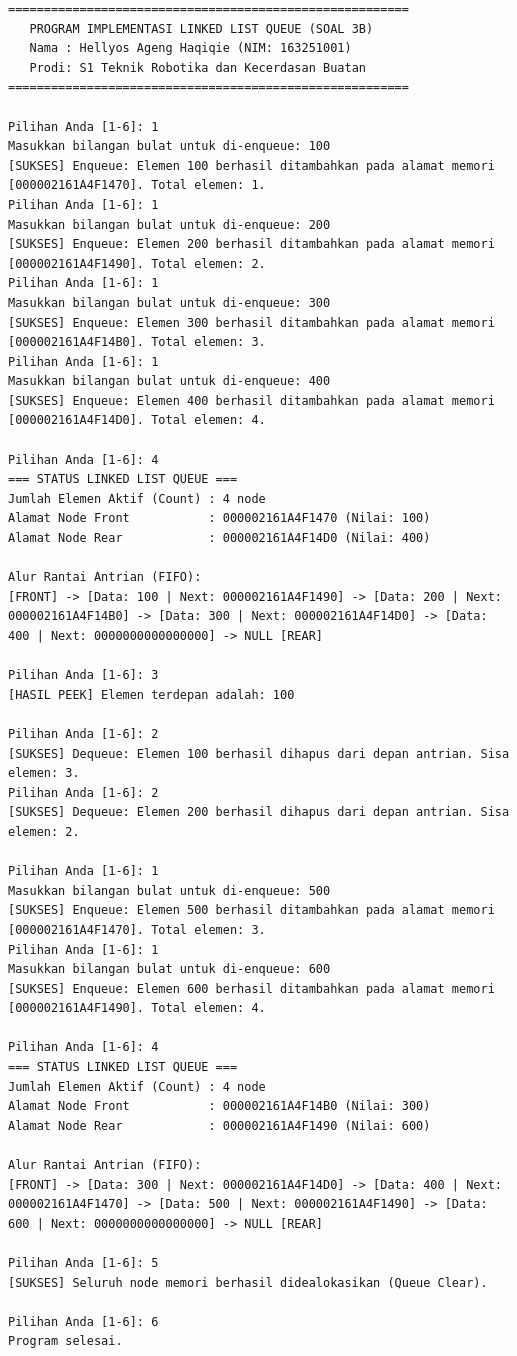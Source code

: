 \documentclass[11pt,a4paper]{article}
\begin{document}
\begin{lstlisting}[style=cmdoutput]
========================================================
   PROGRAM IMPLEMENTASI LINKED LIST QUEUE (SOAL 3B)    
   Nama : Hellyos Ageng Haqiqie (NIM: 163251001)       
   Prodi: S1 Teknik Robotika dan Kecerdasan Buatan      
========================================================

Pilihan Anda [1-6]: 1
Masukkan bilangan bulat untuk di-enqueue: 100
[SUKSES] Enqueue: Elemen 100 berhasil ditambahkan pada alamat memori [000002161A4F1470]. Total elemen: 1.
Pilihan Anda [1-6]: 1
Masukkan bilangan bulat untuk di-enqueue: 200
[SUKSES] Enqueue: Elemen 200 berhasil ditambahkan pada alamat memori [000002161A4F1490]. Total elemen: 2.
Pilihan Anda [1-6]: 1
Masukkan bilangan bulat untuk di-enqueue: 300
[SUKSES] Enqueue: Elemen 300 berhasil ditambahkan pada alamat memori [000002161A4F14B0]. Total elemen: 3.
Pilihan Anda [1-6]: 1
Masukkan bilangan bulat untuk di-enqueue: 400
[SUKSES] Enqueue: Elemen 400 berhasil ditambahkan pada alamat memori [000002161A4F14D0]. Total elemen: 4.

Pilihan Anda [1-6]: 4
=== STATUS LINKED LIST QUEUE ===
Jumlah Elemen Aktif (Count) : 4 node
Alamat Node Front           : 000002161A4F1470 (Nilai: 100)
Alamat Node Rear            : 000002161A4F14D0 (Nilai: 400)

Alur Rantai Antrian (FIFO):
[FRONT] -> [Data: 100 | Next: 000002161A4F1490] -> [Data: 200 | Next: 000002161A4F14B0] -> [Data: 300 | Next: 000002161A4F14D0] -> [Data: 400 | Next: 0000000000000000] -> NULL [REAR]

Pilihan Anda [1-6]: 3
[HASIL PEEK] Elemen terdepan adalah: 100

Pilihan Anda [1-6]: 2
[SUKSES] Dequeue: Elemen 100 berhasil dihapus dari depan antrian. Sisa elemen: 3.
Pilihan Anda [1-6]: 2
[SUKSES] Dequeue: Elemen 200 berhasil dihapus dari depan antrian. Sisa elemen: 2.

Pilihan Anda [1-6]: 1
Masukkan bilangan bulat untuk di-enqueue: 500
[SUKSES] Enqueue: Elemen 500 berhasil ditambahkan pada alamat memori [000002161A4F1470]. Total elemen: 3.
Pilihan Anda [1-6]: 1
Masukkan bilangan bulat untuk di-enqueue: 600
[SUKSES] Enqueue: Elemen 600 berhasil ditambahkan pada alamat memori [000002161A4F1490]. Total elemen: 4.

Pilihan Anda [1-6]: 4
=== STATUS LINKED LIST QUEUE ===
Jumlah Elemen Aktif (Count) : 4 node
Alamat Node Front           : 000002161A4F14B0 (Nilai: 300)
Alamat Node Rear            : 000002161A4F1490 (Nilai: 600)

Alur Rantai Antrian (FIFO):
[FRONT] -> [Data: 300 | Next: 000002161A4F14D0] -> [Data: 400 | Next: 000002161A4F1470] -> [Data: 500 | Next: 000002161A4F1490] -> [Data: 600 | Next: 0000000000000000] -> NULL [REAR]

Pilihan Anda [1-6]: 5
[SUKSES] Seluruh node memori berhasil didealokasikan (Queue Clear).

Pilihan Anda [1-6]: 6
Program selesai.
\end{lstlisting}
\end{document}
